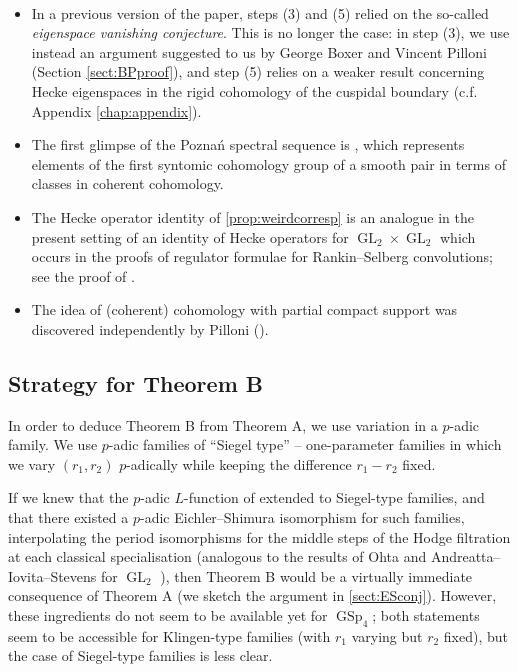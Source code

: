 \documentclass[cjm]{ipart}
\theoremstyle{plain}
\theoremstyle{remark}
\DeclareMathOperator{\GL}{GL}
\DeclareMathOperator{\GSp}{GSp}
\numberwithin{equation}{subsection}
\begin{document}
  \begin{remarknonumber}\
   \begin{itemize}
   	\item In a previous version of the paper, steps (3) and (5) relied on the so-called \textit{eigenspace vanishing conjecture}. This is no longer the case: in step (3), we use instead an argument suggested to us by George Boxer and Vincent Pilloni (Section \ref{sect:BPproof}), and step (5) relies on a weaker result concerning Hecke eigenspaces in the rigid cohomology of the cuspidal boundary (c.f. Appendix \ref{chap:appendix}).

    \item The first glimpse of the Pozna\'n spectral sequence is \cite[Proposition A.16]{bannaikings10}, which represents elements of the first syntomic cohomology group of a smooth pair in terms of classes in coherent cohomology.
    \item The Hecke operator identity of \cref{prop:weirdcorresp} is an analogue in the present setting of an identity of Hecke operators for $\GL_2 \times \GL_2$ which occurs in the proofs of regulator formulae for Rankin--Selberg convolutions; see the proof of \cite[Lemma 6.4.6]{KLZ20}.
    \item The idea of (coherent) cohomology with partial compact support was discovered independently by Pilloni (\cite{pilloni20}).\qedhere
   \end{itemize}
  \end{remarknonumber}


 \subsection{Strategy for Theorem B}

  In order to deduce Theorem B from Theorem A, we use variation in a $p$-adic family. We use $p$-adic families of ``Siegel type'' -- one-parameter families in which we vary $(r_1, r_2)$ $p$-adically while keeping the difference $r_1 - r_2$ fixed.

  If we knew that the $p$-adic $L$-function of \cite{LPSZ1} extended to Siegel-type families, and that there existed a $p$-adic Eichler--Shimura isomorphism for such families, interpolating the period isomorphisms for the middle steps of the Hodge filtration at each classical specialisation (analogous to the results of Ohta \cite{ohta95} and Andreatta--Iovita--Stevens for $\GL_2$ \cite{andreattaiovitastevens}), then Theorem B would be a virtually immediate consequence of Theorem A (we sketch the argument in \cref{sect:ESconj}). However, these ingredients do not seem to be available yet for $\GSp_4$; both statements seem to be accessible for Klingen-type families (with $r_1$ varying but $r_2$ fixed), but the case of Siegel-type families is less clear.
\end{document}
